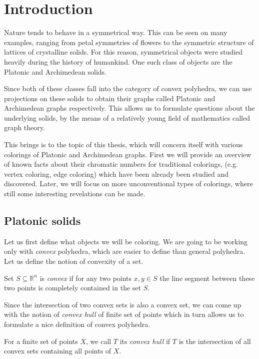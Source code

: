 \chapter*{Introduction}

Nature tends to behave in a symmetrical way. This can be seen on many examples, ranging from petal symmetries of flowers to the symmetric structure of lattices of crystalline solids. For this reason, symmetrical objects were studied heavily during the history of humankind. One such class of objects are the Platonic and Archimedean solids.

Since both of these classes fall into the category of convex polyhedra, we can use projections on these solids to obtain their graphs called Platonic and Archimedean graphs respectively. This allows us to formulate questions about the underlying solids, by the means of a relatively young field of mathematics called graph theory.

This brings is to the topic of this thesis, which will concern itself with various colorings of Platonic and Archimedean graphs. First we will provide an overview of known facts about their chromatic numbers for traditional colorings, (e.g. vertex coloring, edge coloring) which have been already been studied and discovered. Later, we will focus on more unconventional types of colorings, where still some interesting revelations can be made.

\section{Platonic solids}

Let us first define what objects we will be coloring. We are going to be working only with \emph{convex} polyhedra, which are easier to define than general polyhedra. Let us define the notion of convexity of a set.

\begin{define}
Set $S\subseteq\mathbb{R}^{n}$ is {\sl convex} if for any two points $x,y\in S$ the line segment between these two points is completely contained in the set $S$.
\end{define}

Since the intersection of two convex sets is also a convex set, we can come up with the notion of \emph{convex hull} of finite set of points which in turn allows us to formulate a nice definition of convex polyhedra.

\begin{define}
For a finite set of points $X$, we call $T$ its {\sl convex hull} if $T$ is the intersection of all convex sets containing all points of $X$.
\end{define}

